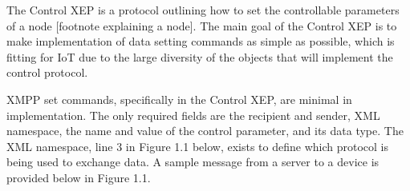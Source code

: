 The Control XEP is a protocol outlining how to set the controllable parameters 
of a node [footnote explaining a node]. The main goal of the Control XEP is 
to make implementation of data setting commands as simple as possible, which is 
fitting for IoT due to the large diversity of the objects that will implement 
the control protocol.\n

XMPP set commands, specifically in the Control XEP, are minimal in implementation. 
The only required fields are the recipient and sender, XML namespace, the name 
and value of the control parameter, and its data type. The XML namespace, line 
3 in Figure 1.1 below, exists to define which protocol is being used to 
exchange data. A sample message from a server to a device is provided below in 
Figure 1.1.\n

